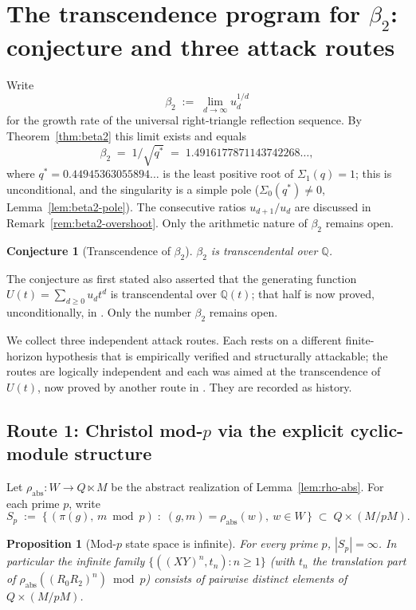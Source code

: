 \documentclass[11pt]{article}
\theoremstyle{plain}
\newtheorem{proposition}[theorem]{Proposition}
\newtheorem{conjecture}[theorem]{Conjecture}
\theoremstyle{definition}
\theoremstyle{remark}
\begin{document}
\section{The transcendence program for \texorpdfstring{$\beta_2$}{beta2}:
conjecture and three attack routes}
\label{sec:transcendence-program}

Write
\[
\beta_2 \;:=\; \lim_{d \to \infty} u_d^{1/d}
\]
for the growth rate of the universal right-triangle reflection sequence. By
Theorem~\ref{thm:beta2} this limit exists and equals
\[
  \beta_2 \;=\; 1/\sqrt{q^\ast} \;=\; 1.4916177871143742268\ldots,
\]
where $q^\ast = 0.44945363055894\ldots$ is the least positive root of
$\Sigma_1(q) = 1$; this is unconditional, and the singularity is a simple pole
($\Sigma_0(q^\ast) \neq 0$, Lemma~\ref{lem:beta2-pole}). The consecutive
ratios $u_{d+1}/u_d$ are discussed in Remark~\ref{rem:beta2-overshoot}. Only
the arithmetic nature of $\beta_2$ remains open.

\begin{conjecture}[Transcendence of $\beta_2$]
\label{conj:beta2-transcendence}
$\beta_2$ is transcendental over $\mathbb{Q}$.
\end{conjecture}
The conjecture as first stated also asserted that the generating function
$U(t)=\sum_{d\ge0}u_dt^d$ is transcendental over $\mathbb{Q}(t)$; that half is
now proved, unconditionally, in \cite{Bonfioli2026b}. Only the number $\beta_2$
remains open.

We collect three independent attack routes.  Each rests on a different
finite-horizon hypothesis that is empirically verified and structurally
attackable; the routes are logically independent and each was aimed at the
transcendence of $U(t)$, now proved by another route in \cite{Bonfioli2026b}.
They are recorded as history.

\subsection{Route 1: Christol mod-\texorpdfstring{$p$}{p} via the explicit
cyclic-module structure}
\label{ssec:christol-route}

Let $\rho_{\mathrm{abs}}: W \to Q \ltimes M$ be the abstract realization of
Lemma~\ref{lem:rho-abs}.  For each prime $p$, write
\[
S_p \;:=\; \bigl\{\,(\pi(g),\, m \bmod p) \;:\; (g,m) = \rho_{\mathrm{abs}}(w),\ w \in W \,\bigr\}
\;\subset\; Q \times (M/pM).
\]

\begin{proposition}[Mod-$p$ state space is infinite]
\label{prop:modp-state-infinite}
For every prime $p$, $|S_p| = \infty$.  In particular the infinite
family $\{((XY)^n, t_n) : n \ge 1\}$ (with $t_n$ the translation part
of $\rho_{\mathrm{abs}}((R_0 R_2)^n) \bmod p$) consists of pairwise
distinct elements of $Q \times (M/pM)$.
\end{proposition}
\end{document}
